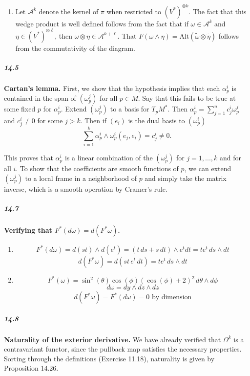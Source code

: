 \documentclass[10pt,letter]{article}
\begin{document}
\begin{enumerate}
\item Let $\mathcal{A}^k$ denote the kernel of $\pi$ when restricted to $(V^{\ast})^{\otimes k}$. The fact that this wedge product is well defined follows from the fact that if $\omega \in \mathcal{A}^k$ and $\eta \in (V^{\ast})^{\otimes \ell}$, then $\omega \otimes \eta \in \mathcal{A}^{k+\ell}$. That $F(\omega \wedge \eta) = \text{Alt}(\tilde{\omega} \otimes \tilde{\eta})$ follows from the commutativity of the diagram.
\end{enumerate}

\subparagraph*{14.5} {\bf Cartan's lemma.} First, we show that the hypothesis implies that each $\alpha^i_p$ is contained in the span of $(\omega^j_p)$ for all $p \in M$. Say that this fails to be true at some fixed $p$ for $\alpha^i_p$. Extend $(\omega^j_p)$ to a basis for $T_pM^{\ast}$. Then $\alpha^i_p = \sum_{j=1}^n c^i_j \omega^j_p$ and $c^i_j \neq 0$ for some $j > k$. Then if $(e_i)$ is the dual basis to $(\omega^i_p)$ \[ \sum_{i=1}^k \alpha^i_p \wedge \omega^i_p(e_j,e_i) = c^i_j \neq 0. \] 

This proves that $\alpha^i_p$ is a linear combination of the $(\omega^j_p)$ for $j = 1,...,k$ and for all $i$. To show that the coefficients are smooth functions of $p$, we can extend $(\omega^j_p)$ to a local frame in a neighborhood of $p$ and simply take the matrix inverse, which is a smooth operation by Cramer's rule. 

\subparagraph*{14.7} {\bf Verifying that $F^{\ast}(d \omega) = d(F^{\ast}\omega)$.} 
\begin{enumerate}
\item \[ F^{\ast}(d\omega) = d(st) \wedge d(e^t) = (t \, ds + s \, dt) \wedge e^t dt = te^t \, ds \wedge dt \]
\[ d(F^{\ast}\omega) = d(st \, e^t \, dt) = te^t \, ds \wedge dt \]
\item \[ F^{\ast}(\omega) =  \sin^2(\theta) \cos(\phi) (\cos(\phi)+2)^2 \, d\theta \wedge d\phi \] 
\[ d\omega = dy \wedge dz \wedge dz \]
\[ d(F^{\ast}\omega) = F^{\ast}(d\omega) = 0 \text{ by dimension} \]
\end{enumerate}

\subparagraph*{14.8} {\bf Naturality of the exterior derivative.} We have already verified that $\Omega^k$ is a contravariant functor, since the pullback map satisfies the necessary properties. Sorting through the definitions (Exercise 11.18), naturality is given by Proposition 14.26. 
\end{document}
